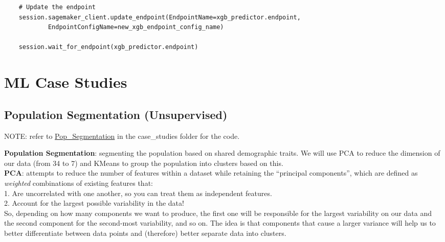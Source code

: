 \documentclass[11pt, a4paper]{article}
\begin{document}
\begin{spacing}{1.1}
\begin{lstlisting}
	# Update the endpoint
	session.sagemaker_client.update_endpoint(EndpointName=xgb_predictor.endpoint, 
			EndpointConfigName=new_xgb_endpoint_config_name)
	
	session.wait_for_endpoint(xgb_predictor.endpoint)                                       
	\end{lstlisting} \newpage

	\section{ML Case Studies}
	\subsection{Population Segmentation (Unsupervised)}
	\begin{center}
	\color{darkgray} NOTE: refer to \href{file:///E:/Documents/UdacityNotes/ML\%20Engineer/sample_code/case_studies/Pop_Segmentation.html}{Pop\_Segmentation} in the case\_studies folder for the code. \color{black}
	\end{center}
	\textbf{Population Segmentation}: segmenting the population based on shared demographic traits. We will use PCA to reduce the dimension of our data (from 34 to 7) and KMeans to group the population into clusters based on this. \vspace*{2mm}\\
	\textbf{PCA}: attempts to reduce the number of features within a dataset while retaining the “principal components”, which are defined as \textit{weighted} combinations of existing features that: \vspace*{.5mm}\\	
	\hspace*{3mm} 1. Are uncorrelated with one another, so you can treat them as independent features. \\
	\hspace*{3mm} 2. Account for the largest possible variability in the data! \vspace*{.5mm}\\
	So, depending on how many components we want to produce, the first one will be responsible for the largest variability on our data and the second component for the second-most variability, and so on. The idea is that components that cause a larger variance will help us to better differentiate between data points and (therefore) better separate data into clusters. \vspace*{2mm}\\

\end{spacing}
\end{document}
